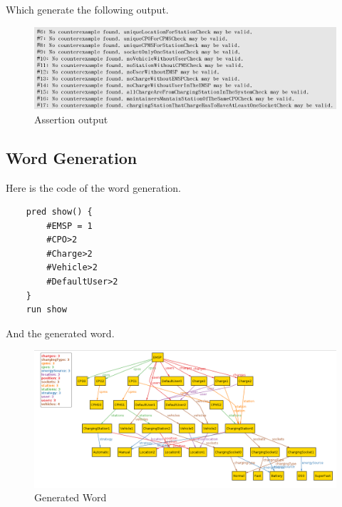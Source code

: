 Which generate the following output.
\begin{figure}[H]
    \includegraphics[keepaspectratio, width=16cm]{Alloy/AssertResult.png}
    \caption{Assertion output}
\end{figure}
\subsection{Word Generation}
Here is the code of the word generation.
\begin{verbatim}
    pred show() {
        #EMSP = 1
        #CPO>2
        #Charge>2
        #Vehicle>2
        #DefaultUser>2
    }
    run show
\end{verbatim}
And the generated word.
\begin{figure}[H]
    \includegraphics[keepaspectratio, width=16cm]{Alloy/WordGenerated.png}
    \caption{Generated Word}
\end{figure}
\clearpage